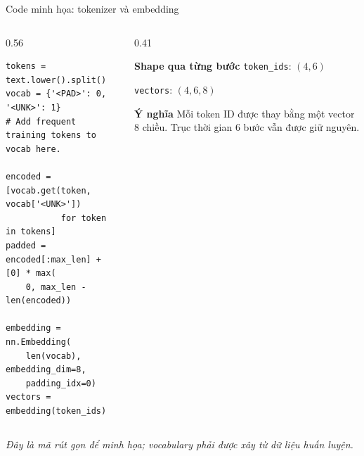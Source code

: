 \documentclass[aspectratio=169, 10pt]{beamer}
\begin{document}
\begin{frame}[fragile]{Code minh họa: tokenizer và embedding}
\small
\begin{columns}[T]
\begin{column}{0.56\textwidth}
\begin{lstlisting}[style=rnnpython]
tokens = text.lower().split()
vocab = {'<PAD>': 0, '<UNK>': 1}
# Add frequent training tokens to vocab here.

encoded = [vocab.get(token, vocab['<UNK>'])
           for token in tokens]
padded = encoded[:max_len] + [0] * max(
    0, max_len - len(encoded))

embedding = nn.Embedding(
    len(vocab), embedding_dim=8,
    padding_idx=0)
vectors = embedding(token_ids)
\end{lstlisting}
\end{column}
\begin{column}{0.41\textwidth}
\begin{block}{\textbf{Shape qua từng bước}}
\texttt{token\_ids}: $(4,6)$\par\vspace{0.25cm}
\texttt{vectors}: $(4,6,8)$
\end{block}
\vspace{0.18cm}
\begin{exampleblock}{\textbf{Ý nghĩa}}
Mỗi token ID được thay bằng một vector 8 chiều. Trục thời gian 6 bước vẫn được giữ nguyên.
\end{exampleblock}
\end{column}
\end{columns}
\vspace{0.15cm}
\footnotesize\textit{Đây là mã rút gọn để minh họa; vocabulary phải được xây từ dữ liệu huấn luyện.}
\end{frame}
\end{document}
